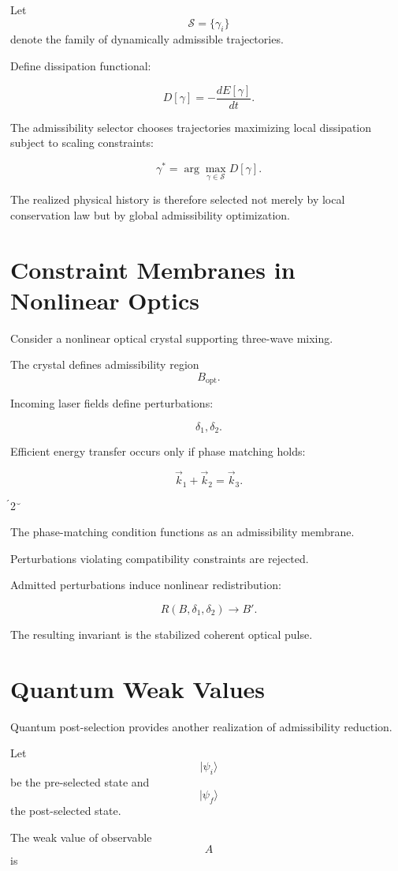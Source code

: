 \documentclass[12pt,openany]{book}
\theoremstyle{plain}
\theoremstyle{definition}
\theoremstyle{remark}
\begin{document}
Let
\[
\mathcal{S}
=
\{\gamma_i\}
\]
denote the family of dynamically admissible trajectories.

Define dissipation functional:

\[
D[\gamma]
=
-
\frac{dE[\gamma]}{dt}.
\]

The admissibility selector chooses trajectories maximizing local
dissipation subject to scaling constraints:

\[
\gamma^\ast
=
\arg\max_{\gamma\in\mathcal{S}}
D[\gamma].
\]

The realized physical history is therefore selected not merely by
local conservation law but by global admissibility optimization.

\section{Constraint Membranes in Nonlinear Optics}

Consider a nonlinear optical crystal supporting three-wave
mixing.

The crystal defines admissibility region
\[
B_{\mathrm{opt}}.
\]

Incoming laser fields define perturbations:

\[
\delta_1,\delta_2.
\]

Efficient energy transfer occurs only if phase matching holds:

\[
\vec{k}_1+\vec{k}_2
=
\vec{k}_3.
\]

2

The phase-matching condition functions as an admissibility
membrane.

Perturbations violating compatibility constraints are rejected.

Admitted perturbations induce nonlinear redistribution:

\[
R(B,\delta_1,\delta_2)\to B'.
\]

The resulting invariant is the stabilized coherent optical pulse.

\section{Quantum Weak Values}

Quantum post-selection provides another realization of
admissibility reduction.

Let
\[
|\psi_i\rangle
\]
be the pre-selected state and
\[
|\psi_f\rangle
\]
the post-selected state.

The weak value of observable
\[
A
\]
is
\end{document}
